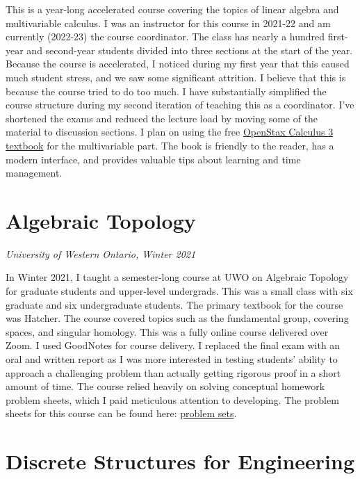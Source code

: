 \documentclass[
]{report}
\begin{document}
This is a year-long accelerated course covering the topics of linear algebra and multivariable calculus. I was an instructor for this course in 2021-22 and am currently (2022-23) the course coordinator. The class has nearly a hundred first-year and second-year students divided into three sections at the start of the year. Because the course is accelerated, I noticed during my first year that this caused much student stress, and we saw some significant attrition. I believe that this is because the course tried to do too much. I have substantially simplified the course structure during my second iteration of teaching this as a coordinator.
I've shortened the exams and reduced the lecture load by moving some of the material to discussion sections.
I plan on using the free \href{https://openstax.org/details/books/calculus-volume-3}{OpenStax Calculus 3 textbook} for the multivariable part.
The book is friendly to the reader, has a modern interface, and provides valuable tips about learning and time management.

\hypertarget{algebraic-topology}{%
\section{Algebraic Topology}\label{algebraic-topology}}

\emph{University of Western Ontario, Winter 2021}

In Winter 2021, I taught a semester-long course at UWO on Algebraic Topology for graduate students and upper-level undergrads. This was a small class with six graduate and six undergraduate students. The primary textbook for the course was Hatcher. The course covered topics such as the fundamental group, covering spaces, and singular homology. This was a fully online course delivered over Zoom. I used GoodNotes for course delivery. I replaced the final exam with an oral and written report as I was more interested in testing students' ability to approach a challenging problem than actually getting rigorous proof in a short amount of time. The course relied heavily on solving conceptual homework problem sheets, which I paid meticulous attention to developing.
The problem sheets for this course can be found here: \href{https://github.com/apurvnakade/uwo2021-algebraic-topology/tree/main/output}{problem sets}.

\hypertarget{discrete-structures-for-engineering}{%
\section{Discrete Structures for Engineering}\label{discrete-structures-for-engineering}}
\end{document}
